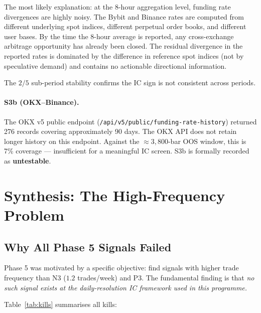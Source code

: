 \documentclass[12pt, a4paper]{article}
\theoremstyle{plain}
\theoremstyle{definition}
\begin{document}
The most likely explanation: at the 8-hour aggregation level, funding
rate divergences are highly noisy.  The Bybit and Binance rates are
computed from different underlying spot indices, different perpetual
order books, and different user bases.  By the time the 8-hour average
is reported, any cross-exchange arbitrage opportunity has already been
closed.  The residual divergence in the reported rates is dominated by
the difference in reference spot indices (not by speculative demand)
and contains no actionable directional information.

The $2/5$ sub-period stability confirms the IC sign is not consistent
across periods.

\paragraph{S3b (OKX--Binance).}
The OKX v5 public endpoint (\texttt{/api/v5/public/funding-rate-history})
returned 276 records covering approximately 90 days.  The OKX API does
not retain longer history on this endpoint.  Against the $\approx 3{,}800$-bar
OOS window, this is 7\% coverage --- insufficient for a meaningful IC
screen.  S3b is formally recorded as \textbf{untestable}.

\section{Synthesis: The High-Frequency Problem}
\label{sec:synthesis}

\subsection{Why All Phase 5 Signals Failed}

Phase 5 was motivated by a specific objective: find signals with higher
trade frequency than N3 ($1.2$ trades/week) and P3.  The fundamental
finding is that \emph{no such signal exists at the daily-resolution IC
framework used in this programme.}

Table~\ref{tab:kills} summarises all kills:
\end{document}
